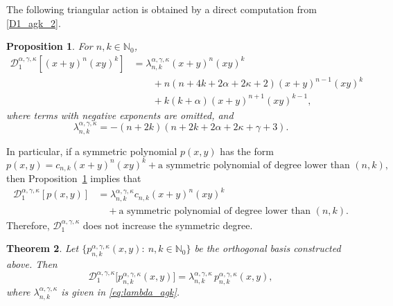 \documentclass[reqno,10pt]{amsart}
\theoremstyle{plain}
\newtheorem{theorem}{Theorem}[section]
\newtheorem{proposition}[theorem]{Proposition}
\numberwithin{equation}{section}
\numberwithin{figure}{section}
\begin{document}
The following triangular action is obtained by a direct computation from
\eqref{D1_agk_2}.

\begin{proposition}\label{prop:D1_triangular_action}
For $n,k\in\mathbb{N}_0$, 
\begin{equation*}%
\begin{aligned}
\mathcal{D}_{1}^{\alpha,\gamma,\kappa}
\left[(x+y)^n(xy)^k\right] & =
\lambda_{n,k}^{\alpha,\gamma,\kappa}(x+y)^n(xy)^k\\
&\qquad
+
n(n+4k+2\alpha+2\kappa+2)(x+y)^{n-1}(xy)^k\\
&\qquad
+
k(k+\alpha)(x+y)^{n+1}(xy)^{k-1},
\end{aligned}
\end{equation*}
where terms with negative exponents are omitted, and
\begin{equation}\label{eq:lambda_agk}
\lambda_{n,k}^{\alpha,\gamma,\kappa}
=
-(n+2k)(n+2k+2\alpha+2\kappa+\gamma+3).
\end{equation}
\end{proposition}

In particular, if a symmetric polynomial $p(x,y)$ has the form
\[
p(x,y)
=
c_{n,k}(x+y)^n(xy)^k
+
\text{a symmetric polynomial of degree lower than }(n,k),
\]
then Proposition~\ref{prop:D1_triangular_action} implies that
\begin{align*}
\mathcal{D}_{1}^{\alpha,\gamma,\kappa}[p(x,y)]
&=
\lambda_{n,k}^{\alpha,\gamma,\kappa}
c_{n,k}(x+y)^n(xy)^k
\\
&\quad
+
\text{a symmetric polynomial of degree lower than }(n,k).
\end{align*}
Therefore, $\mathcal{D}_{1}^{\alpha,\gamma,\kappa}$ does not increase the
symmetric degree.

\begin{theorem}\label{th:D1_eigen}
Let $\{p_{n,k}^{\alpha,\gamma,\kappa}(x,y):\ n,k\in\mathbb{N}_0\}$ be the orthogonal basis
constructed above. Then
\[
\mathcal{D}_{1}^{\alpha,\gamma,\kappa}
\big[p_{n,k}^{\alpha,\gamma,\kappa}(x,y)\big]
=
\lambda_{n,k}^{\alpha,\gamma,\kappa}\,
p_{n,k}^{\alpha,\gamma,\kappa}(x,y),
\]
where $\lambda_{n,k}^{\alpha,\gamma,\kappa}$ is given in
\eqref{eq:lambda_agk}.
\end{theorem}
\end{document}
